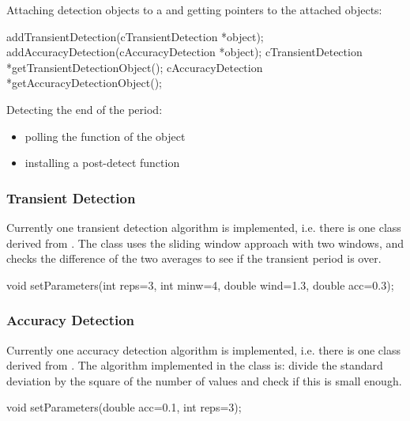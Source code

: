 %
%

Attaching detection objects to a  and getting pointers
to the attached objects:

\begin{cpp}
addTransientDetection(cTransientDetection *object);
addAccuracyDetection(cAccuracyDetection *object);
cTransientDetection *getTransientDetectionObject();
cAccuracyDetection *getAccuracyDetectionObject();
\end{cpp}


Detecting the end of the period:
\begin{itemize}
\item{polling the  function of the object}
\item{installing a post-detect function}
\end{itemize}


\subsubsection{Transient Detection}


Currently one transient detection algorithm
is implemented, i.e.  there is one class derived from
. The  class
uses the sliding window approach with two windows, and checks the
difference of the two averages to see if the transient period is over.

\begin{cpp}
void setParameters(int reps=3,
                   int minw=4,
                   double wind=1.3,
                   double acc=0.3);
\end{cpp}

\subsubsection{Accuracy Detection}


Currently one accuracy detection algorithm
is implemented, i.e.  there is one class derived from
. The algorithm implemented in the
 class is: divide the standard deviation by the
square of the number of values and check if this is small enough.

\begin{cpp}
void setParameters(double acc=0.1, int reps=3);
\end{cpp}




